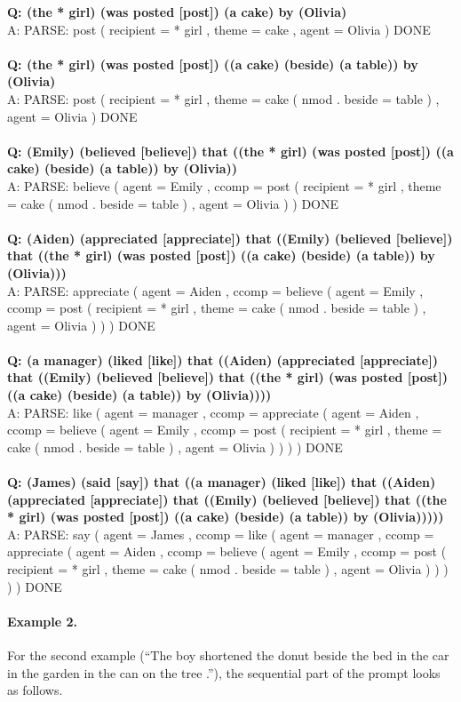 \documentclass{article} \usepackage{iclr2022_conference,times}
\newcommand{\prompt}[1]{{\footnotesize \textsf{#1}}}
\begin{document}
\prompt{\textbf{Q: (the * girl) (was posted [post]) (a cake) by (Olivia)} \\
A: PARSE: post ( recipient = * girl , theme = cake , agent = Olivia ) DONE \\
\\
\textbf{Q: (the * girl) (was posted [post]) ((a cake) (beside) (a table)) by (Olivia)} \\
A: PARSE: post ( recipient = * girl , theme = cake ( nmod . beside = table ) , agent = Olivia ) DONE \\
\\
\textbf{Q: (Emily) (believed [believe]) that ((the * girl) (was posted [post]) ((a cake) (beside) (a table)) by (Olivia))} \\
A: PARSE: believe ( agent = Emily , ccomp = post ( recipient = * girl , theme = cake ( nmod . beside = table ) , agent = Olivia ) ) DONE \\
\\
\textbf{Q: (Aiden) (appreciated [appreciate]) that ((Emily) (believed [believe]) that ((the * girl) (was posted [post]) ((a cake) (beside) (a table)) by (Olivia)))} \\
A: PARSE: appreciate ( agent = Aiden , ccomp = believe ( agent = Emily , ccomp = post ( recipient = * girl , theme = cake ( nmod . beside = table ) , agent = Olivia ) ) ) DONE \\
\\
\textbf{Q: (a manager) (liked [like]) that ((Aiden) (appreciated [appreciate]) that ((Emily) (believed [believe]) that ((the * girl) (was posted [post]) ((a cake) (beside) (a table)) by (Olivia))))} \\
A: PARSE: like ( agent = manager , ccomp = appreciate ( agent = Aiden , ccomp = believe ( agent = Emily , ccomp = post ( recipient = * girl , theme = cake ( nmod . beside = table ) , agent = Olivia ) ) ) ) DONE \\
\\
\textbf{Q: (James) (said [say]) that ((a manager) (liked [like]) that ((Aiden) (appreciated [appreciate]) that ((Emily) (believed [believe]) that ((the * girl) (was posted [post]) ((a cake) (beside) (a table)) by (Olivia)))))} \\
A: PARSE: say ( agent = James , ccomp = like ( agent = manager , ccomp = appreciate ( agent = Aiden , ccomp = believe ( agent = Emily , ccomp = post ( recipient = * girl , theme = cake ( nmod . beside = table ) , agent = Olivia ) ) ) ) ) DONE
}

\paragraph{Example 2.}
For the second example (``The boy shortened the donut beside the bed in the car in the garden in the can on the tree .''), the sequential part of the prompt looks as follows.
\end{document}
